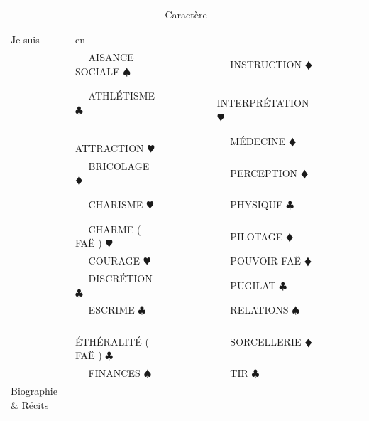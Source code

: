 \documentclass[11pt,twoside,a4paper]{article}
\newcommand{\competencebox}[1][~~]{ #1 }%
\begin{document}
\begin{landscape}
\begin{tabular}[h]{ p{} p{}|p{} p{}|p{} p{} }
						&						&	Caractère				&		&										&		\\
						&						&							&		&										&		\\
						&						&							&		&										&		\\
	\hline
	Je suis					&	en															&							&																&						&						\\
	\competencebox{~~}		&	\competencebox{AISANCE SOCIALE { $\spadesuit$ }}			&	\competencebox{~~}		&	\competencebox{INSTRUCTION {\color{red} $\vardiamond$ }}	&	\competencebox{~~}	&	\competencebox{~~}	\\
	\competencebox{~~}		&	\competencebox{ATHLÉTISME { $\clubsuit$ }}					&	\competencebox{~~}		&	\competencebox{INTERPRÉTATION {\color{red} $\varheart$ }}	&	\competencebox{~~}	&	\competencebox{~~}	\\
	\competencebox{~~}		&	\competencebox{ATTRACTION {\color{red} $\varheart$ }}		&	\competencebox{~~}		&	\competencebox{MÉDECINE {\color{red} $\vardiamond$ }}		&	\competencebox{~~}	&	\competencebox{~~}	\\
	\competencebox{~~}		&	\competencebox{BRICOLAGE {\color{red} $\vardiamond$ }}		&	\competencebox{~~}		&	\competencebox{PERCEPTION {\color{red} $\vardiamond$ }}		&	\competencebox{~~}	&	\competencebox{~~}	\\
	\competencebox{~~}		&	\competencebox{CHARISME {\color{red} $\varheart$ }}			&	\competencebox{~~}		&	\competencebox{PHYSIQUE { $\clubsuit$ }}					&	\competencebox{~~}	&	\competencebox{~~}	\\
	\competencebox{~~}		&	\competencebox{CHARME ( FAË ) {\color{red} $\varheart$ }}	&	\competencebox{~~}		&	\competencebox{PILOTAGE {\color{red} $\vardiamond$ }}		&						&						\\
	\competencebox{~~}		&	\competencebox{COURAGE {\color{red} $\varheart$ }}			&	\competencebox{~~}		&	\competencebox{POUVOIR FAË {\color{red} $\vardiamond$ }}	&						&						\\
	\competencebox{~~}		&	\competencebox{DISCRÉTION { $\clubsuit$ }}					&	\competencebox{~~}		&	\competencebox{PUGILAT { $\clubsuit$ }}						&						&						\\
	\competencebox{~~}		&	\competencebox{ESCRIME { $\clubsuit$ }}						&	\competencebox{~~}		&	\competencebox{RELATIONS { $\spadesuit$ }}					&						&						\\
	\competencebox{~~}		&		\competencebox{ÉTHÉRALITÉ ( FAË ) { $\clubsuit$ }}		&	\competencebox{~~}		&	\competencebox{SORCELLERIE {\color{red} $\vardiamond$ }}	&						&						\\
	\competencebox{~~}		&	\competencebox{FINANCES { $\spadesuit$ }}					&	\competencebox{~~}		&	\competencebox{TIR { $\clubsuit$ }}							&						&						\\
	\hline
	Biographie \& Récits	&																&							&																&						&						\\	


\end{tabular}
\end{landscape}
\end{document}
